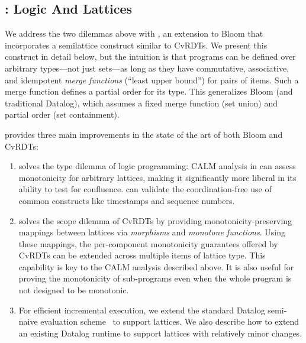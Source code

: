 \subsection{\lang: Logic And Lattices}
We address the two dilemmas above with \emph{\lang,} an extension to Bloom that
incorporates a semilattice construct similar to CvRDTs.  We present this
construct in detail below, but the intuition is that \lang programs can be
defined over arbitrary types---not just sets---as long as they have commutative,
associative, and idempotent \emph{merge functions} (``least upper bound'') for
pairs of items.  Such a merge function defines a partial order for its
type. This generalizes Bloom (and traditional Datalog), which assumes a fixed
merge function (set union) and partial order (set containment).


\lang provides three main improvements in the state of the art of both Bloom and CvRDTs:  
\begin{enumerate}
\item \lang solves the type dilemma of logic programming: CALM analysis in \lang
  can assess monotonicity for arbitrary lattices, making it significantly
  more liberal in its ability to test for confluence.  \lang can validate the
  coordination-free use of common constructs like timestamps and sequence
  numbers.

\item {\lang} solves the scope dilemma of CvRDTs by providing
  monotonicity-preserving mappings between lattices via \emph{morphisms} and
  \emph{monotone functions}.  Using these mappings, the per-component
  monotonicity guarantees offered by CvRDTs can be extended across multiple
  items of lattice type.  This capability is key to the CALM analysis described
  above.  It is also useful for proving the monotonicity of sub-programs
  even when the whole program is not designed to be monotonic.

\item For efficient incremental execution, we extend the standard Datalog
  semi-naive evaluation scheme~\cite{Balbin1987} to support lattices. We also
  describe how to extend an existing Datalog runtime to support lattices with
  relatively minor changes.
\end{enumerate}

